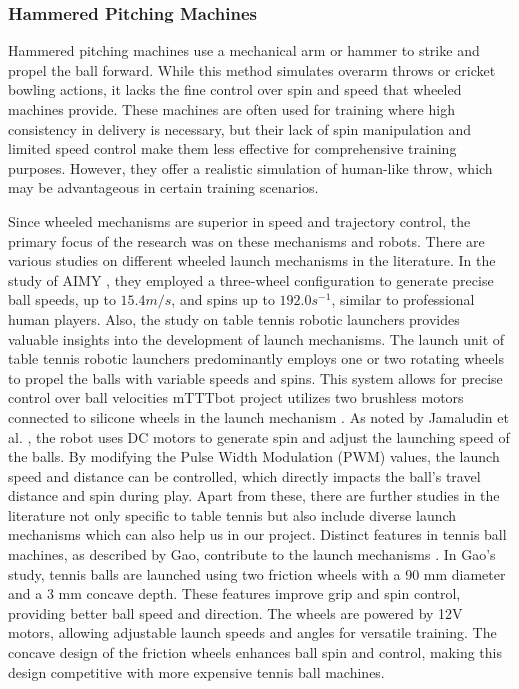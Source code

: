 \documentclass[12pt]{report}
\newenvironment{indentedsection}{
    \setlength{\parindent}{1cm} %
    \setlength{\leftskip}{1cm} %
}{}
\begin{document}
\begin{indentedsection}
\subsubsection{Hammered Pitching Machines}

Hammered pitching machines use a mechanical arm or hammer to strike and propel the ball forward. While this method simulates overarm throws or cricket bowling actions, it lacks the fine control over spin and speed that wheeled machines provide. These machines are often used for training where high consistency in delivery is necessary, but their lack of spin manipulation and limited speed control make them less effective for comprehensive training purposes. However, they offer a realistic simulation of  human-like throw, which may be advantageous in certain training scenarios. \\

\end{indentedsection}

Since wheeled mechanisms are superior in speed and trajectory control, the primary focus of the research was on these mechanisms and robots. There are various studies on different wheeled launch mechanisms in the literature. In the study of AIMY \cite{Dittrich2023}, they employed a three-wheel configuration to generate precise ball speeds, up to $15.4 m/s$, and spins up to $192.0 s^{-1}$, similar to professional human players.  Also, the study on table tennis robotic launchers \cite{Jamaludin2022} provides valuable insights into the development of launch mechanisms. The launch unit of table tennis robotic launchers predominantly employs one or two rotating wheels to propel the balls with variable speeds and spins. This system allows for precise control over ball velocities mTTTbot project utilizes two brushless motors connected to silicone wheels in the launch mechanism \cite{Tasci2023}. As noted by Jamaludin et al. \cite{Jamaludin2022}, the robot uses DC motors to generate spin and adjust the launching speed of the balls. By modifying the Pulse Width Modulation (PWM) values, the launch speed and distance can be controlled, which directly impacts the ball’s travel distance and spin during play. Apart from these, there are further studies in the literature not only specific to table tennis but also include diverse launch mechanisms which can also help us in our project. Distinct features in tennis ball machines, as described by Gao, contribute to the launch mechanisms \cite{Gao2019}. In Gao’s study, tennis balls are launched using two friction wheels with a 90 mm diameter and a 3 mm concave depth. These features improve grip and spin control, providing better ball speed and direction. The wheels are powered by 12V motors, allowing adjustable launch speeds and angles for versatile training. The concave design of the friction wheels enhances ball spin and control, making this design competitive with more expensive tennis ball machines.
\end{document}

